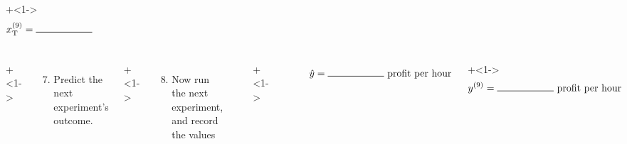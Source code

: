 \begin{frame}
\begin{columns}[T]
			\vspace{-1.3cm}
			\onslide+<1->{	
				\begin{align*} 
					x_\text{T}^{(9)} &= \rule{2cm}{.5pt}~~~~~~~~~~~~~~~~~~~
				\end{align*}
			}
	\end{columns}
	
	\vspace{-0.3cm}
	\begin{columns}[T]

			\vspace{0cm}
			\onslide+<1->{
				{\tiny 
					\begin{enumerate}\setcounter{enumi}{6}
						\item	Predict the next experiment's outcome.
					\end{enumerate}
				
				\par}
			}
			
			\vspace{0cm}
			\onslide+<1->{
				{\tiny 
					\begin{enumerate}\setcounter{enumi}{7}
						\item	Now run the next experiment, and record the values
					\end{enumerate}
				
				\par}
			}
			
			\rule[3mm]{0.01cm}{85mm}%
			
			
			\onslide+<1->{	
				\hrule
				
				\begin{align*}
					~~~\hat{y}  = \rule{2cm}{.5pt} ~\text{profit per hour} 
				\end{align*}
			}
			
			\vspace{-1.15cm}
			\onslide+<1->{	
				\begin{align*}
					y^{(9)} &=  \rule{2cm}{.5pt} ~\text{profit per hour}
				\end{align*}
			}
	\end{columns}
	
\end{frame}

